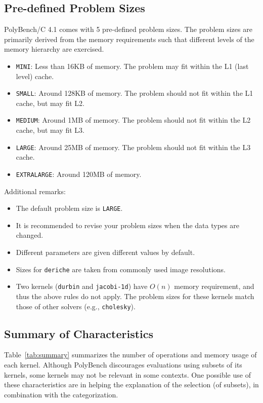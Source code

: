 \documentclass{article}
\newcommand\polybenchversion{4.1\xspace}
\begin{document}
\subsection*{Pre-defined Problem Sizes}
PolyBench/C \polybenchversion comes with 5 pre-defined problem sizes. The problem sizes are
primarily derived from the memory requirements such that different levels of
the memory hierarchy are exercised.

\begin{itemize}
\item {\tt MINI}: Less than 16KB of memory. The problem may fit within the L1 (last level) cache.
\item {\tt SMALL}: Around 128KB of memory. The problem should not fit within the L1 cache, but may fit L2.
\item {\tt MEDIUM}: Around 1MB of memory. The problem should not fit within the L2 cache, but may fit L3.
\item {\tt LARGE}: Around 25MB of memory. The problem should not fit within the L3 cache.
\item {\tt EXTRALARGE}: Around 120MB of memory. 
\end{itemize}

Additional remarks:
\begin{itemize}
\item The default problem size is {\tt LARGE}.
\item It is  recommended to revise your problem sizes when the data types are changed.
\item Different parameters are given different values by default.
\item Sizes for {\tt deriche} are taken from commonly used image resolutions.
\item Two kernels ({\tt durbin} and {\tt jacobi-1d}) have $O(n)$ memory requirement, and thus the above rules do not apply.
The problem sizes for these kernels match those of other solvers (e.g., {\tt cholesky}).
\end{itemize}

\subsection*{Summary of Characteristics}
Table~\ref{tab:summary} summarizes the number of operations and memory usage of
each kernel. Although PolyBench discourages evaluations using subsets of its
kernels, some kernels may not be relevant in some contexts. One possible use of
these characteristics are in helping the explanation of the selection (of
subsets), in combination with the categorization.
\end{document}
